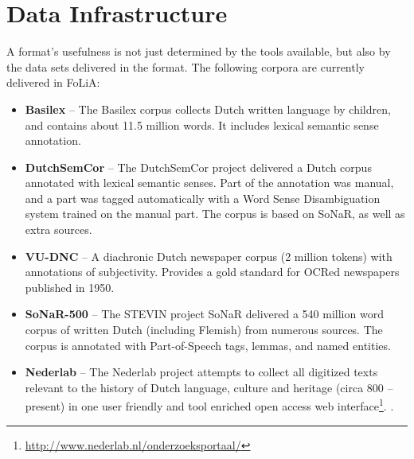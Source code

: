\documentclass[a4paper,11pt]{article}
\begin{document}

\section{Data Infrastructure}
\label{sec:datainfrastructure}

A format's usefulness is not just determined by the tools
available, but also by the data sets delivered in the format.
The following corpora are currently delivered in FoLiA:

\begin{itemize}
    \item \textbf{Basilex} -- The Basilex corpus collects Dutch written language by children,
        and contains about 11.5 million words. It includes lexical semantic sense
        annotation. \cite{BASILEX}
    \item \textbf{DutchSemCor} -- The DutchSemCor project delivered a Dutch corpus annotated
        with lexical semantic senses. Part of the annotation was manual, and a
        part was tagged automatically with a Word Sense Disambiguation system trained on
        the manual part. The corpus is based on SoNaR, as well as extra
        sources. \cite{DUTCHSEMCOR}
    \item \textbf{VU-DNC} -- A diachronic Dutch newspaper corpus (2 million tokens) with annotations of subjectivity. Provides a gold standard for OCRed newspapers published in 1950. \cite{VUDNC}
    \item \textbf{SoNaR-500} --  The STEVIN project SoNaR delivered a 540 million
        word corpus of written Dutch (including Flemish) from numerous sources.
        The corpus is annotated with Part-of-Speech tags, lemmas, and named
        entities. \cite{StevinSONAR2013}
    \item \textbf{Nederlab} -- The Nederlab project attempts to collect all digitized texts relevant to the history of Dutch language, culture and heritage (circa 800 -- present) in one user friendly and tool enriched open access web interface\footnote{\url{http://www.nederlab.nl/onderzoeksportaal/}}. \cite{Nederlab2016}. 
\end{itemize}
\end{document}
